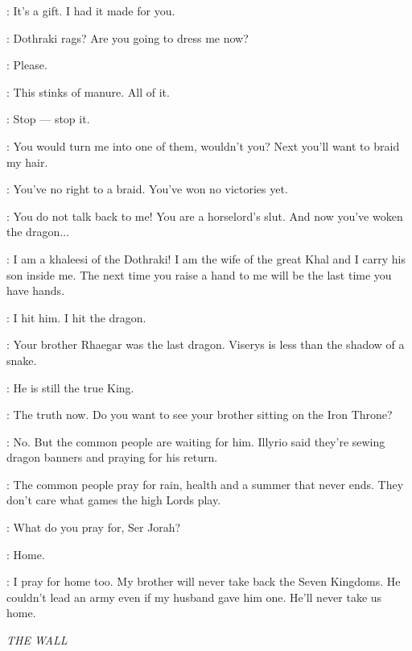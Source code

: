 \DAENERYS: It's a gift. I had it made for you. 

\VISERYS: Dothraki rags? Are you going to dress me now? 

\DAENERYS: Please. 

\VISERYS: This stinks of manure. All of it. 

\DAENERYS: Stop --- stop it. 

\VISERYS: You would turn me into one of them, wouldn't you? Next you'll want to braid my hair. 

\DAENERYS: You've no right to a braid. You've won no victories yet. 


\VISERYS: You do not talk back to me! You are a horselord's slut. And now you've woken the dragon$\ldots$ 


\DAENERYS: I am a khaleesi of the Dothraki! I am the wife of the great Khal and I carry his son inside me. The next time you raise a hand to me will be the last time you have hands. 


\DAENERYS: I hit him. I hit the dragon. 

\JORAH: Your brother Rhaegar was the last dragon. Viserys is less than the shadow of a snake. 

\DAENERYS: He is still the true King. 

\JORAH: The truth now. Do you want to see your brother sitting on the Iron Throne? 

\DAENERYS: No. But the common people are waiting for him. Illyrio said they're sewing dragon banners and praying for his return. 

\JORAH: The common people pray for rain, health and a summer that never ends. They don't care what games the high Lords play. 

\DAENERYS: What do you pray for, Ser Jorah? 

\JORAH: Home. 

\DAENERYS: I pray for home too. My brother will never take back the Seven Kingdoms. He couldn't lead an army even if my husband gave him one. He'll never take us home. 


\scene

\textit{THE WALL}


